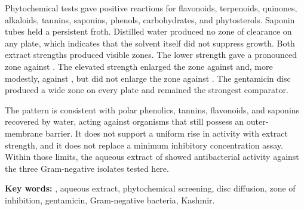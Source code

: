 \noindent Phytochemical tests gave positive reactions for flavonoids, terpenoids, quinones, alkaloids, tannins, saponins, phenols, carbohydrates, and phytosterols. Saponin tubes held a persistent froth. Distilled water produced no zone of clearance on any plate, which indicates that the solvent itself did not suppress growth. Both extract strengths produced visible zones. The lower strength gave a pronounced zone against . The elevated strength enlarged the zone against  and, more modestly, against , but did not enlarge the zone against . The gentamicin disc produced a wide zone on every plate and remained the strongest comparator.

\noindent The pattern is consistent with polar phenolics, tannins, flavonoids, and saponins recovered by water, acting against organisms that still possess an outer-membrane barrier. It does not support a uniform rise in activity with extract strength, and it does not replace a minimum inhibitory concentration assay. Within those limits, the aqueous extract of  showed \invitro{} antibacterial activity against the three Gram-negative isolates tested here.

\vspace{0.2in}
\noindent \textbf{Key words:} , aqueous extract, phytochemical screening, disc diffusion, zone of inhibition, gentamicin, Gram-negative bacteria, Kashmir.
